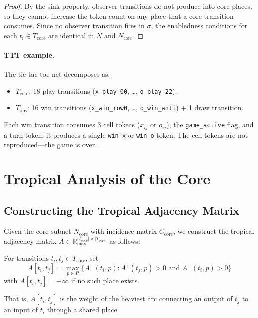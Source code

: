\documentclass[11pt,a4paper]{article}
\newcommand{\R}{\mathbb{R}}
\newcommand{\Rmax}{\R_{\max}}
\begin{document}
\begin{proof}
By the sink property, observer transitions do not produce into core places, so they cannot increase the token count on any place that a core transition consumes.
Since no observer transition fires in $\sigma$, the enabledness conditions for each $t_i \in T_{\mathrm{core}}$ are identical in $N$ and $N_{\mathrm{core}}$.
\end{proof}

\paragraph{TTT example.}
The tic-tac-toe net decomposes as:
\begin{itemize}
  \item $T_{\mathrm{core}}$: 18 play transitions (\texttt{x\_play\_00}, \ldots, \texttt{o\_play\_22}).
  \item $T_{\mathrm{obs}}$: 16 win transitions (\texttt{x\_win\_row0}, \ldots, \texttt{o\_win\_anti}) $+$ 1 draw transition.
\end{itemize}

Each win transition consumes 3 cell tokens ($x_{ij}$ or $o_{ij}$), the \texttt{game\_active} flag, and a turn token; it produces a single \texttt{win\_x} or \texttt{win\_o} token.
The cell tokens are not reproduced---the game is over.

\section{Tropical Analysis of the Core}
\label{sec:tropical}

\subsection{Constructing the Tropical Adjacency Matrix}

Given the core subnet $N_{\mathrm{core}}$ with incidence matrix $C_{\mathrm{core}}$, we construct the tropical adjacency matrix $A \in \Rmax^{|T_{\mathrm{core}}| \times |T_{\mathrm{core}}|}$ as follows:

For transitions $t_i, t_j \in T_{\mathrm{core}}$, set
\[
  A[t_i, t_j] = \max_{p \in P} \{ A^-(t_i, p) : A^+(t_j, p) > 0 \text{ and } A^-(t_i, p) > 0 \}
\]
with $A[t_i, t_j] = -\infty$ if no such place exists.

That is, $A[t_i, t_j]$ is the weight of the heaviest arc connecting an output of $t_j$ to an input of $t_i$ through a shared place.
\end{document}
